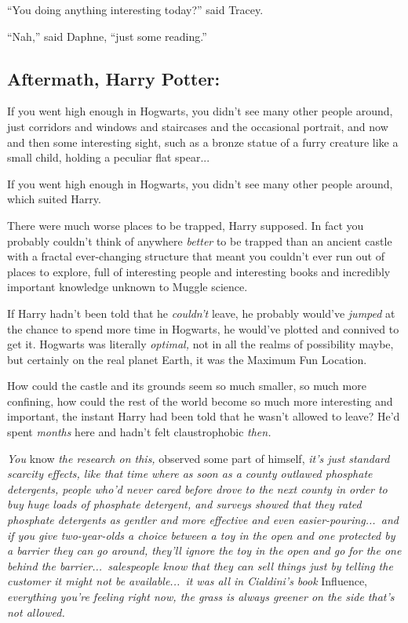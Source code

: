 \noindent{}“You doing anything interesting today?” said Tracey.

“Nah,” said Daphne, “just some reading.”
\replacement{\sbreak}{}

\subsection{Aftermath, Harry Potter:}

\noindent{}If you went high enough in Hogwarts, you didn’t see many other people around, just corridors and windows and staircases and the occasional portrait, and now and then some interesting sight, such as a bronze statue of a furry creature like a small child, holding a peculiar flat spear...

If you went high enough in Hogwarts, you didn’t see many other people around, which suited Harry.

There were much worse places to be trapped, Harry supposed. In fact you probably couldn’t think of anywhere \emph{better} to be trapped than an ancient castle with a fractal ever-changing structure that meant you couldn’t ever run out of places to explore, full of interesting people and interesting books and incredibly important knowledge unknown to Muggle science.

If Harry hadn’t been told that he \emph{couldn’t} leave, he probably would’ve \emph{jumped} at the chance to spend more time in Hogwarts, he would’ve plotted and connived to get it. Hogwarts was literally \emph{optimal,} not in all the realms of possibility maybe, but certainly on the real planet Earth, it was the Maximum Fun Location.

How could the castle and its grounds seem so much smaller, so much more confining, how could the rest of the world become so much more interesting and important, the instant Harry had been told that he wasn’t allowed to leave? He’d spent \emph{months} here and hadn’t felt claustrophobic \emph{then.}

\emph{You} know \emph{the research on this,} observed some part of himself, \emph{it’s just standard scarcity effects, like that time where as soon as a county outlawed phosphate detergents, people who’d never cared before drove to the next county in order to buy huge loads of phosphate detergent, and surveys showed that they rated phosphate detergents as gentler and more effective and even easier-pouring...\ and if you give two-year-olds a choice between a toy in the open and one protected by a barrier they can go around, they’ll ignore the toy in the open and go for the one behind the barrier...\ salespeople know that they can sell things just by telling the customer it might not be available...\ it was all in Cialdini’s book} Influence, \emph{everything you’re feeling right now, the grass is always greener on the side that’s not allowed.}

